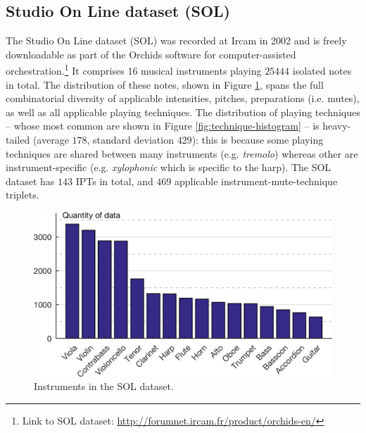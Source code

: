 \documentclass{article}
\makeatletter
\newcommand*{\eg}{e.g.\@\xspace}
\newcommand*{\ie}{i.e.\@\xspace}
\makeatother
\begin{document}
\subsection{Studio On Line dataset (SOL)}

The Studio On Line dataset (SOL) was recorded at Ircam in 2002 and is freely downloadable as part of the Orchids software for computer-assisted orchestration.\footnote{Link to SOL dataset: \url{http://forumnet.ircam.fr/product/orchids-en/}}
It comprises 16 musical instruments playing $25444$ isolated notes in total.
The distribution of these notes, shown in Figure \ref{fig:instrument-histogram}, spans the full combinatorial diversity of applicable intensities, pitches, preparations (\ie{} mutes), as well as all applicable playing techniques.
The distribution of playing techniques -- whose most common are shown in Figure \ref{fig:technique-histogram} -- is heavy-tailed (average $178$, standard deviation $429$): this is because some playing techniques are shared between many instruments (\eg{} \textit{tremolo}) whereas other are instrument-specific (\eg{} \textit{xylophonic} which is specific to the harp).
The SOL dataset has $143$ IPTs in total, and $469$ applicable instrument-mute-technique triplets.

\begin{figure}[t!]
\centering
\includegraphics[width=\linewidth]{./figs/histogram/histogram_instruments.png}
\caption{Instruments in the SOL dataset.}
\label{fig:instrument-histogram}
\end{figure}
\end{document}

